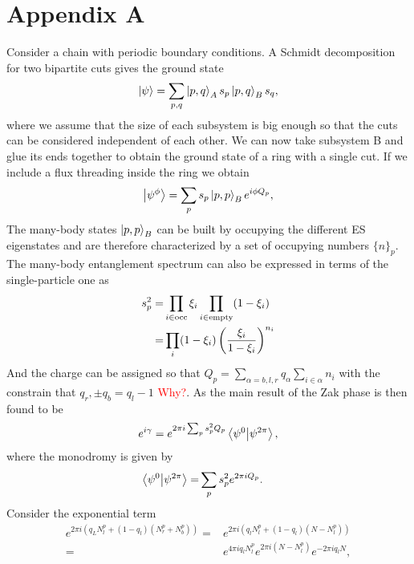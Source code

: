 \documentclass[twocolumn,amsmath,longbibliography,amssymb,superscriptaddress]{revtex4-1}
\begin{document}
	

	
\appendix


\section{Appendix A}\label{app:pollmann}
	
Consider a chain with periodic boundary conditions. A Schmidt decomposition for two bipartite cuts gives the ground state
\begin{equation}
\ket{\psi} = \sum_{p,q} \ket{p,q}_A s_p \ket{p,q}_B s_q,
\end{equation}
where we assume that the size of each subsystem is big enough so that the cuts can be considered independent of each other. We can now take subsystem B and glue its ends together to obtain the ground state of a ring with a single cut. If we include a flux threading inside the ring we obtain
\begin{equation}
\ket{\psi^\phi} = \sum_p s_p \ket{p,p}_B e^{i\phi Q_p},
\end{equation}
The many-body states $\ket{p,p}_B$ can be built by occupying the different ES eigenstates and are therefore characterized by a set of occupying numbers $\{n\}_p$. The many-body entanglement spectrum can also be expressed in terms of the single-particle one \cite{Alexandrinata2011} as
\begin{align}
s_p^2 =& \prod_{i \in {\rm occ}} \xi_i \prod_{i \in {\rm empty}}(1-\xi_i) \\
=& \prod_i (1-\xi_i)\left(\frac{\xi_i}{1-\xi_i} \right)^{n_i}
\end{align}
And the charge can be assigned so that $Q_p = \sum_{\alpha = b,l,r} q_\alpha\sum_{i \in \alpha} n_i$ with the constrain that $q_r,\pm q_b = q_l-1$ \textcolor{red}{Why?}. As the main result of \cite{Zaletel2014} the Zak phase is then found to be
\begin{align}
e^{i\gamma} = e^{2\pi i \sum_p s_p^2 Q_p}  \bra{\psi^0}\ket{\psi^{2\pi}},
\label{zaletel}
\end{align}
where the monodromy is given by
\begin{align}
\bra{\psi^0}\ket{\psi^{2\pi}} =& \sum_p s_p^2 e^{2\pi i Q_p}.
\end{align}
Consider the exponential term
\begin{align*}
e^{2\pi i (q_L N^p_l + (1-q_l)(N^p_r+N^p_b))} =& e^{2\pi i (q_l N^p_l + (1-q_l)(N-N^p_l))} \\
=& e^{4\pi i q_l N^p_l}e^{2 \pi i (N-N^p_l)}e^{-2\pi i q_l N },
\end{align*}
\end{document}
